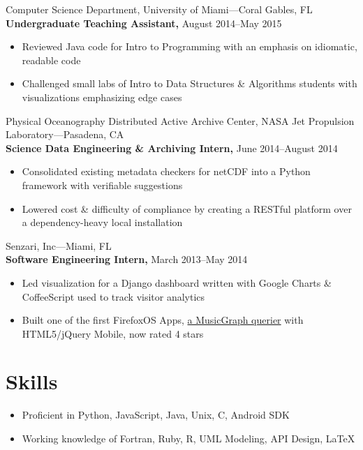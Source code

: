 \documentclass[letterpaper,12pt]{article}
\begin{document}
\vskip 1.5mm

Computer Science Department, University of Miami---Coral Gables, FL\\
\textbf{Undergraduate Teaching Assistant,} August 2014--May 2015
\begin{itemize}
  \item Reviewed Java code for Intro to Programming with an emphasis on idiomatic, readable code
  \item Challenged small labs of Intro to Data Structures \& Algorithms students with visualizations emphasizing edge cases
\end{itemize}

\vskip 1.5mm

Physical Oceanography Distributed Active Archive Center, NASA Jet Propulsion Laboratory---Pasadena, CA\\
\textbf{Science Data Engineering \& Archiving Intern,} June 2014--August 2014
\begin{itemize}
  \item Consolidated existing metadata checkers for netCDF into a Python framework with verifiable suggestions
  \item Lowered cost \& difficulty of compliance by creating a RESTful platform over a dependency-heavy local installation
\end{itemize}

\vskip 1.5mm

Senzari, Inc---Miami, FL\\
\textbf{Software Engineering Intern,} March 2013--May 2014
\begin{itemize}
  \item Led visualization for a Django dashboard written with Google Charts \& CoffeeScript used to track visitor analytics
  \item Built one of the first FirefoxOS Apps, \href{https://marketplace.firefox.com/app/music-graph-1}{a MusicGraph querier} with HTML5/jQuery Mobile, now rated 4 stars
\end{itemize}

\vskip 3.5mm

\section*{Skills}
\begin{itemize}
  \item Proficient in Python, JavaScript, Java, Unix, C, Android SDK
  \item Working knowledge of Fortran, Ruby, R, UML Modeling, API Design, \LaTeX
\end{itemize}
\end{document}
